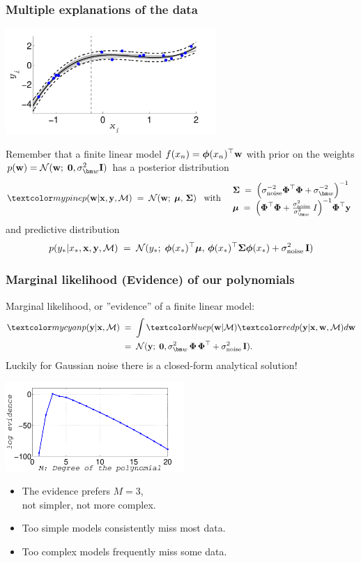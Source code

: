 \begin{frame}
\frametitle{Multiple explanations of the data}

\vskip 1.5mm
\centerline{\includegraphics[width=0.6\textwidth]{polynomial_deg3_predictive_dist_and_post_samples}}

Remember that a finite linear model $f(x_n)=\boldsymbol{\phi}(x_n)^\top\mathbf w$ with prior on the weights 
$p(\bfw)=\N(\bfw;\; \mathbf{0}, \sigma_{\bm w}^2 \bfI)$ has a posterior distribution
\[
\Green{p(\bfw|\bfx,\bfy,\mathcal{M})}\;=\;\N(\bfw;\;\bmu,\,\bSigma)
\mathrm{\; \; \; with \; \; \;}
\begin{array}{l}
\bSigma\;=\;\left(\sigma_\mathrm{noise}^{-2}\bPhi^\top\bPhi+
  \sigma_{\bm w}^{-2}\right)^{-1}\\
\bmu\;=\;\Big(\bPhi^\top\bPhi+
  \frac{\sigma_\mathrm{noise}^2}{\sigma_{\bm w}^2}\,I\Big)^{-1}\bPhi^\top\bfy
\end{array}
\]
and predictive distribution
\[
p(y_*|x_*,\mathbf x, \mathbf y,\mathcal{M})\;=\;
\mathcal{N}(y_*;\; \boldsymbol{\phi}(x_*)^\top{\boldsymbol{\mu}},\,\boldsymbol{\phi}(x_*)^\top\boldsymbol{\Sigma}\boldsymbol{\phi}(x_*)+\sigma_\mathrm{noise}^2\,\mathbf I)
\]
\end{frame}



\begin{frame}
\frametitle{Marginal likelihood (Evidence) of our polynomials}

Marginal likelihood, or ''evidence'' of a finite linear model:
\[
\begin{split}
\Cyan{p(\bfy|\bfx,\mathcal{M})}\;&=\;
\int \Blue{p(\bfw|\mathcal{M})}
\Red{p(\bfy|\bfx,\bfw,\mathcal{M})}  d{\bf w}\\
&=\;\N(\bfy;\;\mathbf{0},\sigma_{\bm w}^2\,\bPhi\,\bPhi^\top+\sigma_\mathrm{noise}^2\,\bfI).
\end{split}
\]
Luckily for Gaussian noise there is a closed-form analytical solution!
%
\parbox{0.5\textwidth}{
\centerline{\includegraphics[width=0.51\textwidth]{polynomial_evidence}}
}
\hfill
\parbox{0.49\textwidth}{
\begin{itemize}
\item The evidence prefers $M=3$,\\ not simpler, not more complex.
\item Too simple models consistently miss most data.
\item Too complex models frequently miss some data.
\end{itemize}
}
\end{frame}


